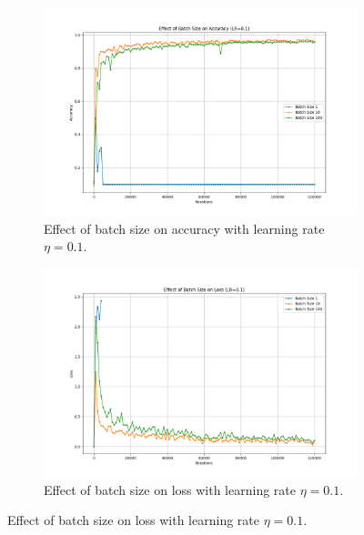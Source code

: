 \documentclass{article}
\begin{document}
\begin{figure}[H]
    \centering
    \begin{subfigure}[t]{0.48\textwidth}
        \vspace{0pt}%
        \centering
        \includegraphics[width=\textwidth]{plots/part2a_batch_size_accuracy.png}
        \caption{Effect of batch size on accuracy with learning rate $\eta=0.1$.}
        \label{fig:batch_size_accuracy}
    \end{subfigure}
    \hfill
    \begin{subfigure}[t]{0.48\textwidth}
        \vspace{0pt}%

        \centering
        \includegraphics[width=\textwidth]{plots/part2a_batch_size_loss.png}
        \caption{Effect of batch size on loss with learning rate $\eta=0.1$.}
        \label{fig:batch_size_loss}
    \end{subfigure}
\end{figure}
\end{document}
